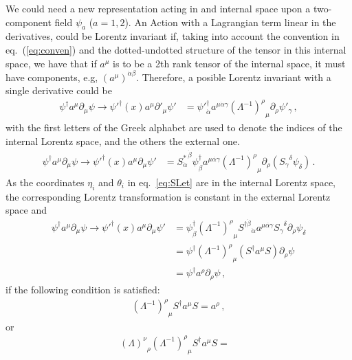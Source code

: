 \begin{frame}
We could need a new representation acting in and internal space upon a
two-component field $\psi_a$ ($a=1,2$). An Action with a Lagrangian term linear in the derivatives, could be Lorentz invariant if, taking into account the convention in eq.~(\ref{eq:conven}) and the dotted-undotted structure of the tensor in this internal space, we have that if $a^{\mu}$ is to be a 2th rank tensor of the internal space, it must have components, e.g, $\left( a^{\mu} \right)^{\dot{\alpha}\beta}$. Therefore, a posible Lorentz invariant with a single derivative could be 
 \begin{align}
   {\psi}^{\dagger}a^\mu\partial_\mu\psi\to  {\psi'}^{\dagger}(x)a^\mu\partial'_\mu\psi'
&={\psi'}^{\dagger}_{\dot{\alpha}}a^{\mu\dot{\alpha}\gamma}{\left(\Lambda^{-1}\right)^\rho}_\mu\partial_\rho \psi'_{\gamma}\,,
\end{align}
with the first letters of the Greek alphabet are used to denote the indices of the internal Lorentz space, and the others the external one. 
\begin{align}
{\psi}^{\dagger}a^\mu\partial_\mu\psi\to  {\psi'}^{\dagger}(x)a^\mu\partial_\mu\psi'
&=
 {S^*_{\dot{\alpha}}}^{\dot{\beta}}{\psi}^{\dagger}_{\dot{\beta}}a^{\mu\dot{\alpha\gamma}}{\left(\Lambda^{-1}\right)^\rho}_\mu\partial_\rho \left( {S_{\gamma}}^{\delta}\psi_\delta \right)\,.
 \end{align} 
As the coordinates $\eta_i$ and $\theta_i$ in eq.~\eqref{eq:SLet} are in the internal Lorentz space, the corresponding Lorentz transformation is constant in the external Lorentz space and
\begin{align}
  {\psi}^{\dagger}a^\mu\partial_\mu\psi\to  {\psi'}^{\dagger}(x)a^\mu\partial_\mu\psi'&=
{\psi}^{\dagger}_{\dot{\beta}}{\left(\Lambda^{-1}\right)^\rho}_\mu {S^{\dagger\dot{\beta}}}_{\dot{\alpha}}a^{\mu\dot{\alpha\gamma}}{S_{\gamma}}^{\delta} \partial_\rho  \psi_\delta \nonumber\\
&=\psi^\dagger {\left(\Lambda^{-1}\right)^\rho}_\mu \left(S^\dagger a^\mu S\right)\partial_\rho\psi\nonumber\\
&=\psi^{\dagger}a^\rho\partial_\rho\psi\,,
\end{align}
if the following condition is satisfied:
\begin{align}
 {\left(\Lambda^{-1}\right)^\rho}_\mu  S^{\dagger}a^\mu S=a^\rho\,,
\end{align}
or
\begin{align}
\label{eq:ltrincond}
{\left(\Lambda\right)^\nu}_\rho{\left(\Lambda^{-1}\right)^\rho}_\mu   S^{\dagger}a^\mu S=&

\end{align}
\end{frame}
